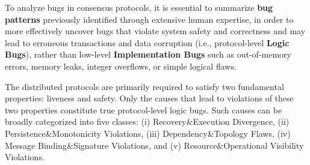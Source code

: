 \documentclass{article}
\theoremstyle{plain}
\theoremstyle{definition}
\theoremstyle{remark}
\begin{document}
To analyze bugs in consensus protocols, it is essential to summarize \textbf{bug patterns} previously identified through extensive human expertise, in order to more effectively uncover bugs that violate system safety and correctness and may lead to erroneous transactions and data corruption (i.e., protocol-level \textbf{Logic Bugs}), rather than low-level \textbf{Implementation Bugs} such as out-of-memory errors, memory leaks, integer overflows, or simple logical flaws.










The distributed protocols are primarily required to satisfy two fundamental properties: liveness and safety. Only the causes that lead to violations of these two properties constitute true protocol-level logic bugs. Such causes can be broadly categorized into five classes: (i) Recovery\&Execution Divergence, (ii) Persistence\&Monotonicity Violations, (iii) Dependency\&Topology Flaws, (iv) Message Binding\&Signature Violations, and (v) Resource\&Operational Visibility Violations.
\end{document}
